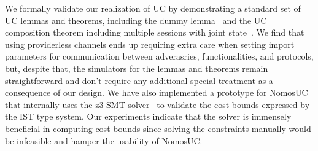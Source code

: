 

We formally validate our realization of UC by demonstrating a standard set of
UC lemmas and theorems, including the dummy
lemma~\cite{ilc,gnuc,easyuc,canettiUC} and the UC composition theorem including
multiple sessions with joint state~\cite{symbolicuc}.  We find that using
providerless channels ends up requiring extra care when setting import
parameters for communication between adverasries, functionalities, and
protocols, but, despite that, the simulators for the lemmas and theorems remain
straightforward and don't require any additional special treatment as a
consequence of our design.  We have also implemented a prototype for NomosUC
that internally uses the z3 SMT solver~\cite{Moura08Z3} to validate the cost
bounds expressed by the IST type system.  Our experiments indicate that the
solver is immensely beneficial in computing cost bounds since solving the
constraints manually would be infeasible and hamper the usability of NomosUC.


